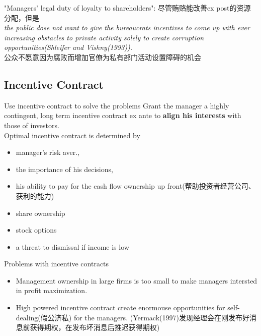 \begin{frame}

	 "Managers' legal duty of loyalty to shareholders": 尽管贿赂能改善ex post的资源分配，但是\\
	\onslide<2-> \textit{the public dose not want to give the bureaucrats incentives to come up with ever increasing obstacles to private activity solely to create corruption opportunities(Shleifer and Vishny(1993)).}\\
			公众不愿意因为腐败而增加官僚为私有部门活动设置障碍的机会
\end{frame}

\subsection{Incentive Contract}
	\begin{frame}{Use incentive contract to solve the problems}
		Grant the manager a highly contingent, long term incentive contract ex ante to \textbf{align his interests} with those of investors. \\
		\onslide<2-> Optimal incentive contract is determined by\\
		\begin{itemize}
		 \item manager's risk aver., \\
		 \item the importance of his decisions, \\
		 \item his ability to pay for the cash flow ownership up front(帮助投资者经营公司、获利的能力)\\
		\vspace{1em}
		\item share ownership
		\item stock options
 		\item a threat to dismissal if income is low
		\end{itemize}

\end{frame}

	\begin{frame}{Problems with incentive contracts}
	\begin{itemize}
	\item Management ownership in large firms is too small to make managers intersted in profit maximization.
	\item High powered incentive contract create enormouse opportunities for self-dealing(假公济私) for the managers. (Yermack(1997)发现经理会在刚发布好消息前获得期权，在发布坏消息后推迟获得期权)
	
	\end{itemize}

\end{frame}

